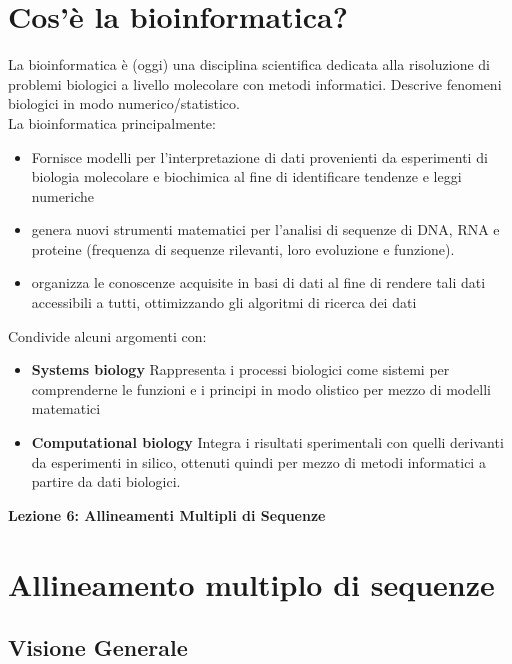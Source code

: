 \documentclass{article}
\begin{document}
\section{Cos'è la bioinformatica?}
La bioinformatica è (oggi) una disciplina scientifica dedicata alla risoluzione di problemi biologici a livello
molecolare con metodi informatici. Descrive fenomeni biologici in modo numerico/statistico.
\\
La bioinformatica principalmente:
    \begin{itemize}
        \item Fornisce modelli per l'interpretazione di dati provenienti da esperimenti di biologia molecolare e biochimica al fine di identificare tendenze e leggi numeriche
        \item genera nuovi strumenti matematici per l'analisi di sequenze di DNA, RNA e proteine (frequenza di sequenze rilevanti, loro evoluzione e funzione).
        \item organizza le conoscenze acquisite in basi di dati al fine di rendere tali dati accessibili a tutti, ottimizzando gli algoritmi di ricerca dei dati
    \end{itemize}
Condivide alcuni argomenti con:
    \begin{itemize} 
        \item \textbf{Systems biology}
            \subitem Rappresenta i processi biologici come sistemi per comprenderne le funzioni e i principi in modo olistico per mezzo di modelli matematici
        \item \textbf{Computational biology}
            \subitem Integra i risultati sperimentali con quelli derivanti da esperimenti in silico, ottenuti quindi per mezzo di metodi informatici a partire da dati biologici.
    \end{itemize}

\begin{titlepage}
    \begin{center}
        \vspace*{1cm}
        \LARGE
        \textbf{Lezione 6: Allineamenti Multipli di Sequenze}

    \end{center}
\end{titlepage}
\section{Allineamento multiplo di sequenze}
\subsection{Visione Generale}
\end{document}
